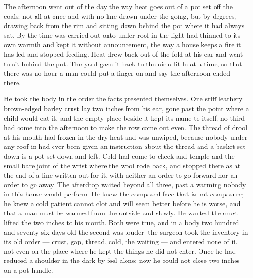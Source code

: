 The afternoon went out of the day the way heat goes out of a pot set off the coals: not all at once and with no line drawn under the going, but by degrees, drawing back from the rim and sitting down behind the pot where it had always sat. By the time  was carried out onto  under  roof in  the light had thinned to its own warmth and kept it without announcement, the way a house keeps a fire it has fed and stopped feeding. Heat drew back out of the fold at his ear and went to sit behind the pot. The yard gave it back to the air a little at a time, so that there was no hour a man could put a finger on and say the afternoon ended there.

He took the body in the order the facts presented themselves. One stiff leathery brown-edged barley crust lay two inches from his ear, gone past the point where a child would eat it, and the empty place beside it kept its name to itself; no third had come into the afternoon to make the row come out even. The thread of drool at his mouth had frozen in the dry heat and was unwiped, because nobody under any roof in  had ever been given an instruction about the thread and a basket set down is a pot set down and left. Cold had come to cheek and temple and the small bare joint of the wrist where the wool rode back, and stopped there as at the end of a line written out for it, with neither an order to go forward nor an order to go away. The afterdrop waited beyond all three, past a warming nobody in this house would perform. He knew the composed face that is not composure; he knew a cold patient cannot clot and will seem better before he is worse, and that a man must be warmed from the outside and slowly. He wanted the crust lifted the two inches to his mouth. Both were true, and in a body two hundred and seventy-six days old the second was louder; the surgeon took the inventory in its old order --- crust, gap, thread, cold, the waiting --- and entered none of it, not even on the place where he kept the things he did not enter. Once he had reduced a shoulder in the dark by feel alone; now he could not close two inches on a pot handle.

